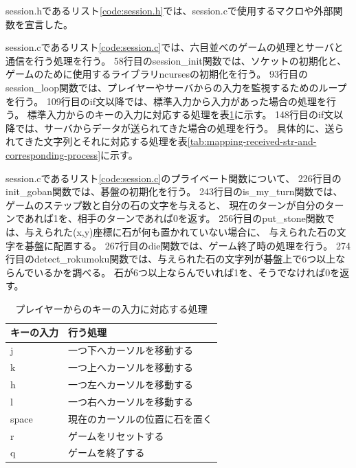 \documentclass[a4j, titlepage, 10pt]{jsarticle}
\begin{document}
session.hであるリスト\ref{code:session.h}では、session.cで使用するマクロや外部関数を宣言した。

\lstset{ numbers = left }


session.cであるリスト\ref{code:session.c}では、六目並べのゲームの処理とサーバと通信を行う処理を行う。
58行目のsession\_init関数では、ソケットの初期化と、ゲームのために使用するライブラリncursesの初期化を行う。
93行目のsession\_loop関数では、プレイヤーやサーバからの入力を監視するためのループを行う。
109行目のif文以降では、標準入力から入力があった場合の処理を行う。
標準入力からのキーの入力に対応する処理を表\ref{tab:player-key-mapping}に示す。
148行目のif文以降では、サーバからデータが送られてきた場合の処理を行う。
具体的に、送られてきた文字列とそれに対応する処理を表\ref{tab:mapping-received-str-and-corresponding-process}に示す。

session.cであるリスト\ref{code:session.c}のプライベート関数について、
226行目のinit\_goban関数では、碁盤の初期化を行う。
243行目のis\_my\_turn関数では、ゲームのステップ数と自分の石の文字を与えると、
現在のターンが自分のターンであれば1を、相手のターンであれば0を返す。
256行目のput\_stone関数では、与えられた(x,y)座標に石が何も置かれていない場合に、
与えられた石の文字を碁盤に配置する。
267行目のdie関数では、ゲーム終了時の処理を行う。
274行目のdetect\_rokumoku関数では、与えられた石の文字列が碁盤上で6つ以上ならんでいるかを調べる。
石が6つ以上ならんでいれば1を、そうでなければ0を返す。

\lstset{ numbers = left }


\begin{table}[H]
  \centering
  \caption{プレイヤーからのキーの入力に対応する処理}
  \label{tab:player-key-mapping}
  \begin{tabular}{ll} \toprule
    キーの入力 & 行う処理 \\
    \midrule
    j & 一つ下へカーソルを移動する \\
    k & 一つ上へカーソルを移動する \\
    h & 一つ左へカーソルを移動する \\
    l & 一つ右へカーソルを移動する \\
    space & 現在のカーソルの位置に石を置く \\
    r & ゲームをリセットする \\
    q & ゲームを終了する \\
    \bottomrule
  \end{tabular}
\end{table}
\end{document}
